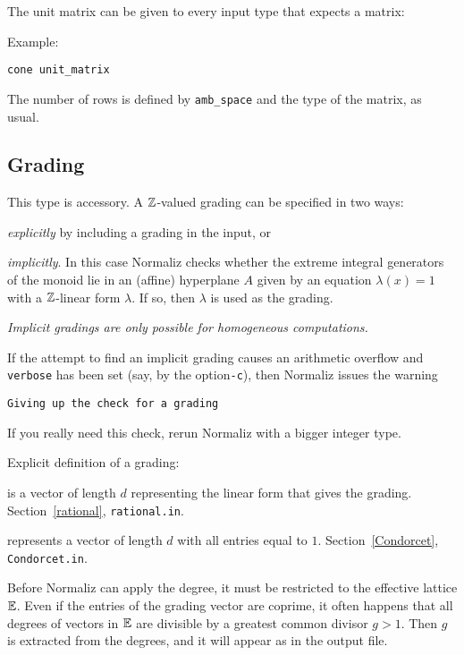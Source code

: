 The unit matrix can be given to every input type that expects a matrix:
\begin{itemize}
\end{itemize}
Example:
\begin{Verbatim}
cone unit_matrix
\end{Verbatim}
The number of rows is defined by \verb|amb_space| and the type of the matrix, as usual.

\subsection{Grading}\label{grading}

This type is accessory. A ${\mathbb Z}$-valued grading can be specified in two ways:
\begin{arab}
	\item \emph{explicitly} by including a grading in the input, or
	\item \emph{implicitly}. In this case Normaliz checks whether
	the extreme integral generators of the monoid lie in an
	(affine) hyperplane $A$ given by an equation $\lambda(x)=1$ with a ${\mathbb Z}$-linear form $\lambda$. If so, then $\lambda$ is used as the grading.\smallskip
	
	\emph{Implicit gradings are only possible for homogeneous computations.}\smallskip
	
	If the attempt to find an implicit grading causes an arithmetic overflow and \texttt{verbose} has been set (say, by the option\texttt{-c}), then Normaliz issues the warning
\begin{Verbatim}
Giving up the check for a grading
\end{Verbatim}
	If you really need this check, rerun Normaliz with a bigger integer type.
\end{arab}

Explicit definition of a grading:
\begin{itemize}
	\itemtt[grading] is a vector of length $d$ representing the linear form that gives the grading. Section~\ref{rational}, \verb|rational.in|.
	
	 represents a vector of length $d$ with all entries equal to $1$. Section~\ref{Condorcet}, \verb|Condorcet.in|.
\end{itemize}

Before Normaliz can apply the degree, it must be restricted
to the effective lattice ${\mathbb E}$. Even if the entries of the
grading vector are coprime, it often happens that all degrees
of vectors in ${\mathbb E}$ are divisible by a greatest common divisor
$ g>1$. Then $g$ is extracted from the degrees, and it will
appear as  in the output file.

